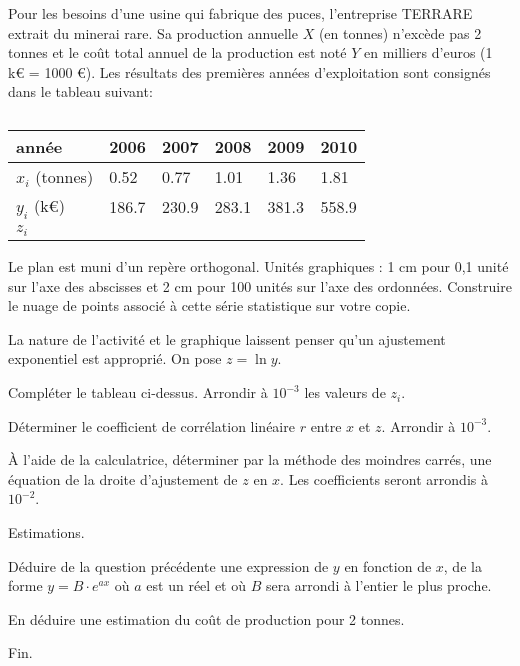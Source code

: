 \documentclass[a4paper,12pt]{scrartcl}
\begin{document}
\exo{}

Pour les besoins d'une usine qui fabrique des puces, l'entreprise TERRARE extrait du minerai rare. Sa production annuelle $X$ (en
tonnes) n'excède pas 2 tonnes et le coût total annuel de la production est noté $Y$ en milliers d'euros (1 k€ = 1000 €).
Les résultats des premières années d'exploitation sont consignés dans le tableau suivant:

\begin{table}[h]
\centering
\caption{}
\label{tableau_2}
\begin{tabular}{|l|l|l|l|l|l|}
\hline
année          & 2006  & 2007  & 2008  & 2009  & 2010  \\ \hline
$x_i$ (tonnes) & 0.52  & 0.77  & 1.01  & 1.36  & 1.81  \\ \hline
$y_i$ (k€)     & 186.7 & 230.9 & 283.1 & 381.3 & 558.9 \\ \hline
$z_i$&&&&& \\ \hline
\end{tabular}
\end{table}

\question{}
Le plan est muni d'un repère orthogonal.
Unités graphiques : 1 cm pour 0,1 unité sur l'axe des abscisses et 2 cm pour 100 unités sur l'axe des ordonnées.
Construire le nuage de points associé à cette série statistique sur votre copie. 

\question{}
La nature de l'activité et le graphique laissent penser qu'un ajustement exponentiel est approprié. On pose $z = \ln y$.

\subquestion{}
Compléter le tableau ci-dessus.
Arrondir à $10^{-3}$ les valeurs de $z_i$.

\subquestion{}
Déterminer le coefficient de corrélation linéaire $r$ entre $x$ et $z$. Arrondir à $10^{-3}$.

\subquestion{}\label{question}
À l'aide de la calculatrice, déterminer par la méthode des moindres carrés, une équation de la droite d'ajustement de $z$
en $x$. Les coefficients seront arrondis à $10^{-2}$.

\question{}
Estimations.

\subquestion{}
Déduire de la question précédente une expression de $y$ en fonction de $x$, de la forme $y = B \cdot e^{ax}$ où $a$ est un réel et où $B$ sera arrondi à l'entier le plus proche.

\subquestion{}
En déduire une estimation du coût de production pour 2 tonnes.


\trait

\begin{center}
Fin.
\end{center}
\end{document}
